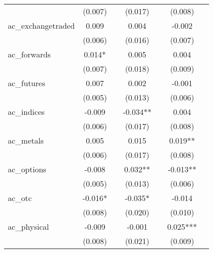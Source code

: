 {\begin{tabular}{l*{6}{c}}
            &     (0.007)   &               &     (0.017)   &               &     (0.008)   &               \\
[1em]
ac\_exchangetraded&       0.009   &               &       0.004   &               &      -0.002   &               \\
            &     (0.006)   &               &     (0.016)   &               &     (0.007)   &               \\
[1em]
ac\_forwards &       0.014*  &               &       0.005   &               &       0.004   &               \\
            &     (0.007)   &               &     (0.018)   &               &     (0.009)   &               \\
[1em]
ac\_futures  &       0.007   &               &       0.002   &               &      -0.001   &               \\
            &     (0.005)   &               &     (0.013)   &               &     (0.006)   &               \\
[1em]
ac\_indices  &      -0.009   &               &      -0.034** &               &       0.004   &               \\
            &     (0.006)   &               &     (0.017)   &               &     (0.008)   &               \\
[1em]
ac\_metals   &       0.005   &               &       0.015   &               &       0.019** &               \\
            &     (0.006)   &               &     (0.017)   &               &     (0.008)   &               \\
[1em]
ac\_options  &      -0.008   &               &       0.032** &               &      -0.013** &               \\
            &     (0.005)   &               &     (0.013)   &               &     (0.006)   &               \\
[1em]
ac\_otc      &      -0.016*  &               &      -0.035*  &               &      -0.014   &               \\
            &     (0.008)   &               &     (0.020)   &               &     (0.010)   &               \\
[1em]
ac\_physical &      -0.009   &               &      -0.001   &               &       0.025***&               \\
            &     (0.008)   &               &     (0.021)   &               &     (0.009)   &               \\

\end{tabular}}
